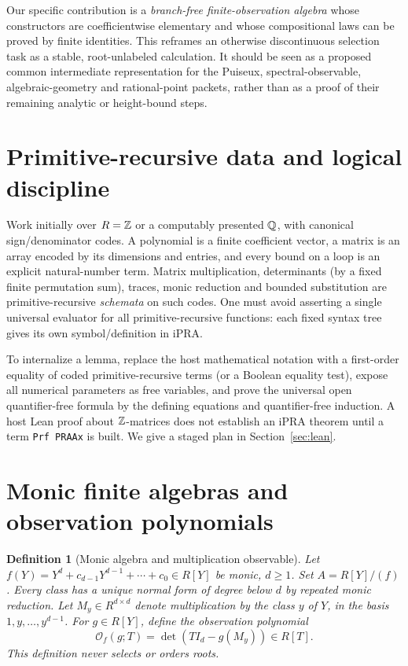 \documentclass[11pt]{article}
\newtheorem{definition}[theorem]{Definition}
\begin{document}
Our specific contribution is a \emph{branch-free finite-observation algebra} whose constructors are coefficientwise elementary and whose compositional laws can be proved by finite identities. This reframes an otherwise discontinuous selection task as a stable, root-unlabeled calculation. It should be seen as a proposed common intermediate representation for the Puiseux, spectral-observable, algebraic-geometry and rational-point packets, rather than as a proof of their remaining analytic or height-bound steps.

\section{Primitive-recursive data and logical discipline}
Work initially over \(R=\mathbb Z\) or a computably presented \(\mathbb Q\), with canonical sign/denominator codes. A polynomial is a finite coefficient vector, a matrix is an array encoded by its dimensions and entries, and every bound on a loop is an explicit natural-number term. Matrix multiplication, determinants (by a fixed finite permutation sum), traces, monic reduction and bounded substitution are primitive-recursive \emph{schemata} on such codes. One must avoid asserting a single universal evaluator for all primitive-recursive functions: each fixed syntax tree gives its own symbol/definition in iPRA.

To internalize a lemma, replace the host mathematical notation with a first-order equality of coded primitive-recursive terms (or a Boolean equality test), expose all numerical parameters as free variables, and prove the universal open quantifier-free formula by the defining equations and quantifier-free induction. A host Lean proof about \(\mathbb Z\)-matrices does not establish an iPRA theorem until a term \texttt{Prf PRAAx} is built. We give a staged plan in Section~\ref{sec:lean}.

\section{Monic finite algebras and observation polynomials}
\begin{definition}[Monic algebra and multiplication observable]
Let \(f(Y)=Y^d+c_{d-1}Y^{d-1}+\cdots+c_0\in R[Y]\) be monic, \(d\ge1\). Set \(A=R[Y]/(f)\). Every class has a unique normal form of degree below \(d\) by repeated monic reduction. Let \(M_y\in R^{d\times d}\) denote multiplication by the class \(y\) of \(Y\), in the basis \(1,y,\ldots,y^{d-1}\). For \(g\in R[Y]\), define the \emph{observation polynomial}
\[
\mathcal O_f(g;T)=\det(TI_d-g(M_y))\in R[T].
\]
This definition never selects or orders roots.
\end{definition}
\end{document}
